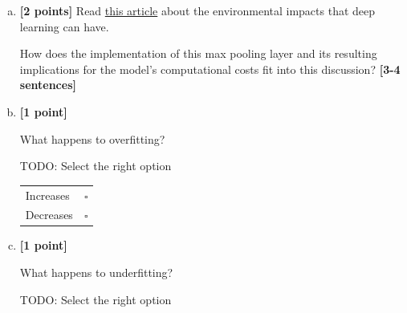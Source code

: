\begin{enumerate}[(a)]
    \item \textbf{[2 points]} Read \href{https://interestingengineering.com/innovation/training-ai-is-shockingly-costly-to-the-environment}{this article} about the environmental impacts that deep learning can have. 
    \begin{tcolorbox}[colback=orange!5!white,colframe=orange!75!black]
    How does the implementation of this max pooling layer and its resulting implications for the model's computational costs fit into this discussion? \textbf{[3-4 sentences]}
    \end{tcolorbox}


    \pagebreak
    \item \textbf{[1 point]}
    \begin{tcolorbox}[colback=orange!5!white,colframe=orange!75!black]
    What happens to overfitting?
    \end{tcolorbox}
    \begin{tcolorbox}[colback=white!5!white,colframe=green!75!black]
    TODO: Select the right option %

\begin{tabular}[h]{lr}
\toprule
Increases & $\square$ \\
Decreases & $\square$ \\
\bottomrule
\end{tabular}
    \end{tcolorbox}

    \item \textbf{[1 point]}
    \begin{tcolorbox}[colback=orange!5!white,colframe=orange!75!black]
    What happens to underfitting?
    \end{tcolorbox}
    \begin{tcolorbox}[colback=white!5!white,colframe=green!75!black]
    TODO: Select the right option %


\end{tcolorbox}
\end{enumerate}
